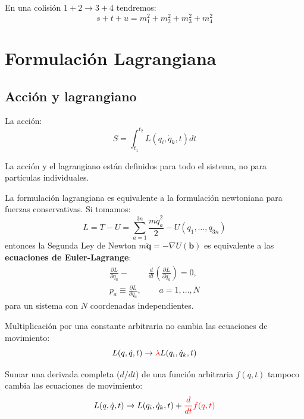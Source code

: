 \documentclass[]{report}
\numberwithin{equation}{section}
\newcommand{\0}{\textcolor{gray}{0}}
\begin{document}
En una colisión \(1 + 2 \rightarrow 3 + 4\) tendremos:
\begin{equation}
	s+t+u = m_1^2 + m_2^2 + m_3^2 + m_4^2
\end{equation}




\section{Formulación Lagrangiana}

\subsection{Acción y lagrangiano}

La acción:
\begin{equation}
	 S = \int_{t_1}^{t_2} L(q_i,\dot{q}_k,t) dt
\end{equation}

La acción y el lagrangiano están definidos para todo el sistema, no para partículas individuales.

La formulación lagrangiana es equivalente a la formulación newtoniana para fuerzas conservativas. Si tomamos:
\begin{equation}
	L = T - U = \sum_{a=1}^{3n}\frac{m \dot{q}_a^2}{2} - U(q_1,\ldots,q_{3n})
\end{equation}
entonces la Segunda Ley de Newton \(m\ddot{\mathbf{q}} = -\nabla U(\mathbf{b})\) es equivalente a las \textbf{ecuaciones de Euler-Lagrange}:
\begin{align}
	\frac{\partial L}{\partial q_a} - &\frac{d}{dt}\left(\frac{\partial L}{\partial \dot{q}_a}\right) = 0,\label{E-L_ecs}\\
	p_a \equiv \frac{\partial L}{\partial\dot{q}_a},&\ \ \ \ \ \ a = 1,\ldots,N\nonumber
\end{align}
para un sistema con \(N\) coordenadas independientes.

Multiplicación por una constante arbitraria no cambia las ecuaciones de movimiento:
\begin{equation}
	L(q,\dot{q},t) \rightarrow \textcolor{red}{\lambda} L(q_i,\dot{q}_k,t)
\end{equation}

Sumar una derivada completa (\(d/dt\)) de una función arbitraria \(f(q,t)\) tampoco cambia las ecuaciones de movimiento:
\begin{equation}
	L(q,\dot{q},t) \rightarrow L(q_i,\dot{q}_k,t) + \textcolor{red}{\frac{d}{dt}f(q,t)}
\end{equation}
\end{document}
